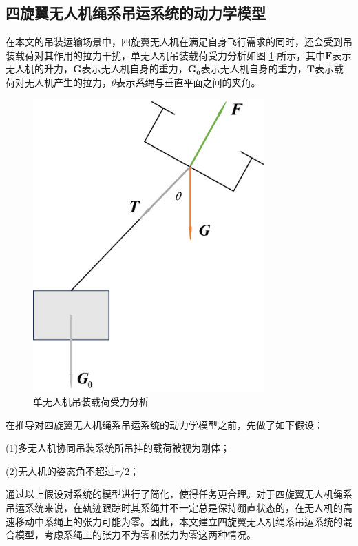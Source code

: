 \documentclass[lang=chs, degree=master, blindreview=false, winfonts=true]{yanputhesis}
\begin{document}
\subsection{四旋翼无人机绳系吊运系统的动力学模型}
在本文的吊装运输场景中，四旋翼无人机在满足自身飞行需求的同时，还会受到吊装载荷对其作用的拉力干扰，单无人机吊装载荷受力分析如图 \ref{2_2} 所示，其中$\bm{F}$表示无人机的升力，$\bm{G}$表示无人机自身的重力，$\bm{G_0}$表示无人机自身的重力，$\bm{T}$表示载荷对无人机产生的拉力，$\theta$表示系绳与垂直平面之间的夹角。
\begin{figure}[hbt!]
	\centering
	\includegraphics[width=21pc]{picture/2_2.png} 
	\caption{单无人机吊装载荷受力分析} \label{2_2}
\end{figure}

在推导对四旋翼无人机绳系吊运系统的动力学模型之前，先做了如下假设：

(1)多无人机协同吊装系统所吊挂的载荷被视为刚体； 

(2)无人机的姿态角不超过$\pi/2$；

 
通过以上假设对系统的模型进行了简化，使得任务更合理。对于四旋翼无人机绳系吊运系统来说，在轨迹跟踪时其系绳并不一定总是保持绷直状态的，在无人机的高速移动中系绳上的张力可能为零。因此，本文建立四旋翼无人机绳系吊运系统的混合模型，考虑系绳上的张力不为零和张力为零这两种情况。
\end{document}
